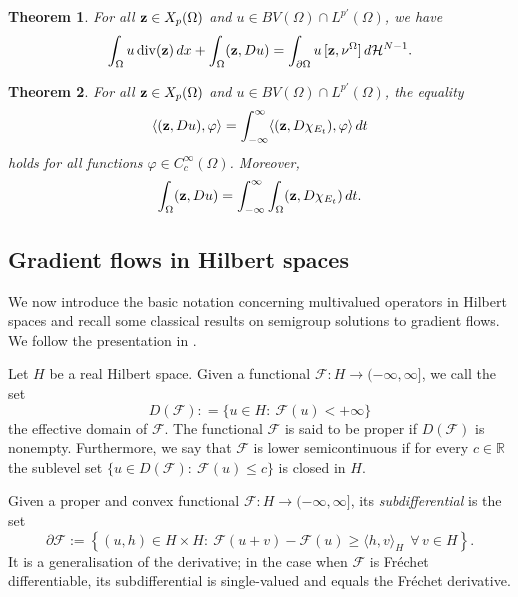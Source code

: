 \documentclass[reqno,12pt]{amsart}
\def\z{{\bf z}}
\newtheorem{theorem}{Theorem}[section]
\def\R{\mathbb R}
\numberwithin{equation}{section}
\begin{document}
\begin{theorem}
For all $\z \in X_p(\Omega)$ and $u \in BV(\Omega) \cap L^{p'}(\Omega)$, we have
\begin{equation}\label{thm:isotropicgreenformula}
\int_{\Omega} u \, \mathrm{div} (\z) \, dx + \int_{\Omega} (\z, Du) = \int_{\partial \Omega} u \, [\z, \nu^\Omega] \, d\mathcal{H}^{N-1}.
\end{equation}
\end{theorem}

\begin{theorem}\label{thm:isotropiccoarea}
For all $\z \in X_p(\Omega)$ and $u \in BV(\Omega) \cap L^{p'}(\Omega)$, the equality
\begin{equation*}
\langle (\z, Du), \varphi \rangle = \int_{-\infty}^\infty \langle (\z, D\chi_{E_t}),\varphi \rangle \, dt
\end{equation*}
holds for all functions $\varphi \in C_c^\infty(\Omega)$. Moreover,
\begin{equation*}
\int_\Omega (\z, Du) = \int_{-\infty}^\infty \int_\Omega (\z, D\chi_{E_t}) \, dt.
\end{equation*}
\end{theorem}


\subsection{Gradient flows in Hilbert spaces}\label{sec:breziskomura}

We now introduce the basic notation concerning multivalued operators in Hilbert spaces and recall some classical results on semigroup solutions to gradient flows. We follow the presentation in \cite{Brezis}. 

Let $H$ be a real Hilbert space. Given a functional $\mathcal{F}: H \to (-\infty, \infty]$, we call the set
$$D(\mathcal{F}) : = \{ u \in H: \ \mathcal{F}(u) < + \infty \}$$
the effective domain of $\mathcal{F}$. The functional $\mathcal{F}$ is said to be proper if $D(\mathcal{F})$ is nonempty.
Furthermore, we say that $\mathcal{F}$ is lower semicontinuous if for every $c \in \R$ the sublevel set $\{ u \in D(\mathcal{F}): \ \mathcal{F}(u) \leq c \}$ is closed in $H$.

Given a proper and convex functional $\mathcal{F} : H \to (-\infty, \infty]$, its {\it subdifferential} is the set
\begin{equation}\label{subdif2}\partial \mathcal{F} := \left\{(u,h) \in H \times H: \ \mathcal{F}(u+v) - \mathcal{F}(u) \geq \langle h, v \rangle_H \ \ \forall \, v \in H \right\}.
\end{equation}
It is a generalisation of the derivative; in the case when $\mathcal{F}$ is Fr\'{e}chet differentiable, its subdifferential is single-valued and equals the Fr\'{e}chet derivative.
\end{document}
